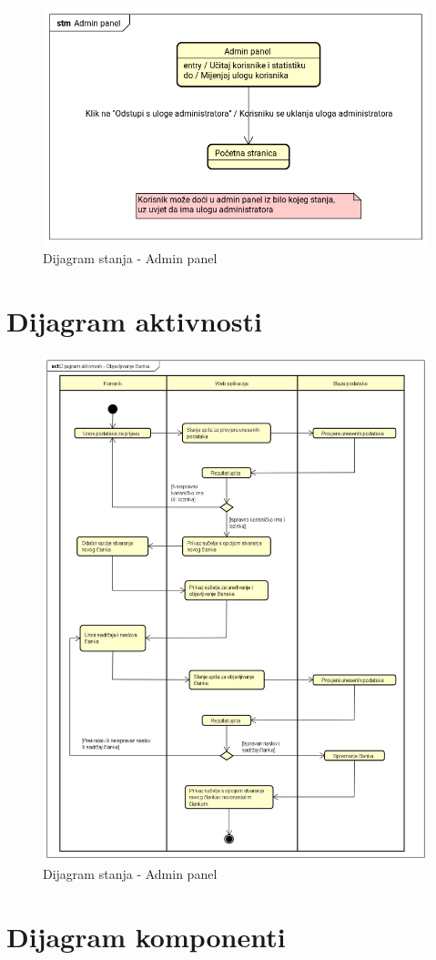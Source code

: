 \begin{figure}[H]
	\includegraphics[scale=0.4]{slike/dijagrami-stanja/admin-panel.png}
	\centering
	\caption{Dijagram stanja - Admin panel}
	\label{fig:state_diagram_admin}
\end{figure}

\eject 


\section{Dijagram aktivnosti}

\begin{figure}[H]
	\includegraphics[scale=0.4]{slike/dijagram-aktivnosti.jpeg}
	\centering
	\caption{Dijagram stanja - Admin panel}
	\label{fig:activity_diagram}
\end{figure}

\eject


\section{Dijagram komponenti}
